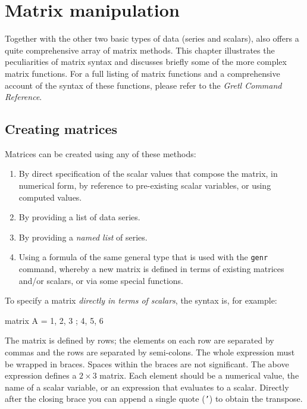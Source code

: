 \chapter{Matrix manipulation}
\label{chap:matrices}

Together with the other two basic types of data (series and scalars),
 also offers a quite comprehensive array of matrix
methods. This chapter illustrates the peculiarities of matrix syntax
and discusses briefly some of the more complex matrix functions. For a
full listing of matrix functions and a comprehensive account of the
syntax of these functions, please refer to the \emph{Gretl Command
  Reference}.

\section{Creating matrices}
\label{sec:matrix-create}

Matrices can be created using any of these methods:

\begin{enumerate}
\item By direct specification of the scalar values that compose the
  matrix, in numerical form, by reference to pre-existing
  scalar variables, or using computed values.
\item By providing a list of data series.
\item By providing a \textit{named list} of series.
\item Using a formula of the same general type that is used
  with the \texttt{genr} command, whereby a new matrix is defined
  in terms of existing matrices and/or scalars, or via some
  special functions.
\end{enumerate}

To specify a matrix \textit{directly in terms of scalars}, the syntax
is, for example:

\begin{code}
matrix A = { 1, 2, 3 ; 4, 5, 6 }
\end{code}

The matrix is defined by rows; the elements on each row are separated
by commas and the rows are separated by semi-colons.  The whole
expression must be wrapped in braces.  Spaces within the braces are
not significant.  The above expression defines a $2\times3$ matrix.
Each element should be a numerical value, the name of a scalar
variable, or an expression that evaluates to a scalar.  Directly after
the closing brace you can append a single quote (\texttt{'}) to obtain
the transpose.

